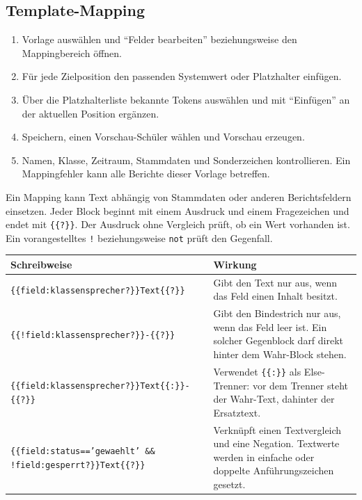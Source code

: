 \documentclass[12pt,a4paper]{article}
\begin{document}
\subsection{Template-Mapping}
\begin{enumerate}
  \item Vorlage auswählen und \enquote{Felder bearbeiten} beziehungsweise den Mappingbereich öffnen.
  \item Für jede Zielposition den passenden Systemwert oder Platzhalter einfügen.
  \item Über die Platzhalterliste bekannte Tokens auswählen und mit \enquote{Einfügen} an der aktuellen Position ergänzen.
  \item Speichern, einen Vorschau-Schüler wählen und Vorschau erzeugen.
  \item Namen, Klasse, Zeitraum, Stammdaten und Sonderzeichen kontrollieren. Ein Mappingfehler kann alle Berichte dieser Vorlage betreffen.
\end{enumerate}

Ein Mapping kann Text abhängig von Stammdaten oder anderen Berichtsfeldern einsetzen. Jeder Block beginnt mit einem Ausdruck und einem Fragezeichen und endet mit \texttt{\{\{?\}\}}. Der Ausdruck ohne Vergleich prüft, ob ein Wert vorhanden ist. Ein vorangestelltes \texttt{!} beziehungsweise \texttt{not} prüft den Gegenfall.

{\small
\begin{tabularx}{\textwidth}{|>{\raggedright\arraybackslash}p{}|X|}
\hline
\textbf{Schreibweise} & \textbf{Wirkung}\tabularnewline
\hline
\texttt{\{\{field:\allowbreak klassensprecher?\}\}\allowbreak Text\allowbreak\{\{?\}\}} & Gibt den Text nur aus, wenn das Feld einen Inhalt besitzt.\tabularnewline
\hline
\texttt{\{\{!field:\allowbreak klassensprecher?\}\}\allowbreak-\allowbreak\{\{?\}\}} & Gibt den Bindestrich nur aus, wenn das Feld leer ist. Ein solcher Gegenblock darf direkt hinter dem Wahr-Block stehen.\tabularnewline
\hline
\texttt{\{\{field:\allowbreak klassensprecher?\}\}\allowbreak Text\allowbreak\{\{:\}\}\allowbreak-\allowbreak\{\{?\}\}} & Verwendet \texttt{\{\{:\}\}} als Else-Trenner: vor dem Trenner steht der Wahr-Text, dahinter der Ersatztext.\tabularnewline
\hline
\texttt{\{\{field:status=='gewaehlt'\allowbreak{} \&\&\allowbreak{} !field:gesperrt?\}\}\allowbreak Text\allowbreak\{\{?\}\}} & Verknüpft einen Textvergleich und eine Negation. Textwerte werden in einfache oder doppelte Anführungszeichen gesetzt.\tabularnewline
\hline
\end{tabularx}
}
\end{document}
